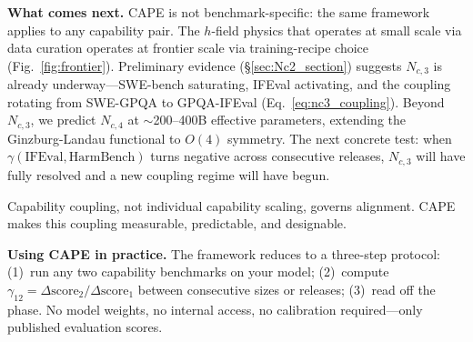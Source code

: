 \documentclass[11pt]{article}
\begin{document}
\textbf{What comes next.}
CAPE is not benchmark-specific: the same framework applies to any capability pair.
The $h$-field physics that operates at small scale via data curation operates at frontier scale via training-recipe choice (Fig.~\ref{fig:frontier}).
Preliminary evidence (\S\ref{sec:Nc2_section}) suggests $N_{c,3}$ is already underway---SWE-bench saturating, IFEval activating, and the coupling rotating from SWE-GPQA to GPQA-IFEval (Eq.~\ref{eq:nc3_coupling}).
Beyond $N_{c,3}$, we predict $N_{c,4}$ at $\sim$200--400B effective parameters, extending the Ginzburg-Landau functional to $O(4)$ symmetry.
The next concrete test: when $\gamma(\text{IFEval}, \text{HarmBench})$ turns negative across consecutive releases, $N_{c,3}$ will have fully resolved and a new coupling regime will have begun.

Capability coupling, not individual capability scaling, governs alignment.
CAPE makes this coupling measurable, predictable, and designable.

\medskip
\noindent\textbf{Using CAPE in practice.}
The framework reduces to a three-step protocol: (1)~run any two capability benchmarks on your model; (2)~compute $\gamma_{12} = \Delta\text{score}_2/\Delta\text{score}_1$ between consecutive sizes or releases; (3)~read off the phase.
No model weights, no internal access, no calibration required---only published evaluation scores.
\end{document}
